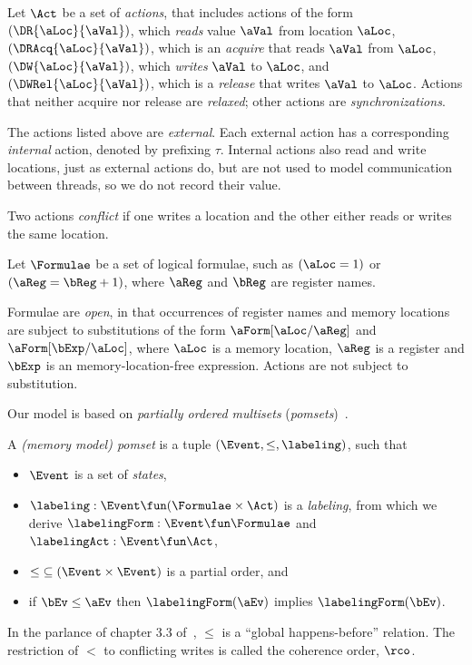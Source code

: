 Let $\Act$ be a set of \emph{actions}, that includes actions of the form
$(\DR{\aLoc}{\aVal})$, which \emph{reads} value $\aVal$ from location
$\aLoc$, $(\DRAcq{\aLoc}{\aVal})$, which is an \emph{acquire} that reads
$\aVal$ from $\aLoc$, $(\DW{\aLoc}{\aVal})$, which \emph{writes} $\aVal$ to
$\aLoc$, and $(\DWRel{\aLoc}{\aVal})$, which is a \emph{release} that writes
$\aVal$ to $\aLoc$. %
Actions that neither acquire nor release are \emph{relaxed}; other actions
are \emph{synchronizations}.

The actions listed above are \emph{external}.  Each external action has a
corresponding \emph{internal} action, denoted by prefixing $\tau$.  Internal
actions also read and write locations, just as external actions do,
but are not used to model communication between threads,
so we do not record their value.

Two actions \emph{conflict} if one writes a location and the other
either reads or writes the same location.

Let $\Formulae$ be a set of logical formulae, such as $(\aLoc=1)$ or
$(\aReg=\bReg+1)$, where $\aReg$ and $\bReg$ are register names.

Formulae are \emph{open}, in that occurrences of register names and memory
locations are subject to substitutions of the form $\aForm[\aLoc/\aReg]$ and
$\aForm[\bExp/\aLoc]$, where $\aLoc$ is a memory location, $\aReg$ is a
register and $\bExp$ is an memory-location-free expression.  Actions are not
subject to substitution.

Our model is based on \emph{partially ordered multisets} (\emph{pomsets})~\cite{GISCHER1988199}.
\begin{definition}
  \label{def:mmpomset}
  A \emph{(memory model) pomset} is a tuple
  $(\Event, {\le}, %
  \labeling)$, such that
  \begin{itemize}
  \item $\Event$ is a set of \emph{states},
  \item $\labeling: \Event \fun (\Formulae\times\Act)$ is a \emph{labeling},
    from which we derive $\labelingForm:\Event\fun\Formulae$ and $\labelingAct:\Event\fun\Act$,
  \item ${\le} \subseteq (\Event\times\Event)$ is a partial order, and
  \item if $\bEv\le\aEv$ then $\labelingForm(\aEv)$ implies
    $\labelingForm(\bEv)$.
  \end{itemize}
\end{definition}
In the parlance of chapter 3.3 of~\citet{AlglaveThesis}, $\le$ is a ``global
happens-before'' relation.  The restriction of $\lt$ to conflicting writes is
called the coherence order, $\rco$.  

